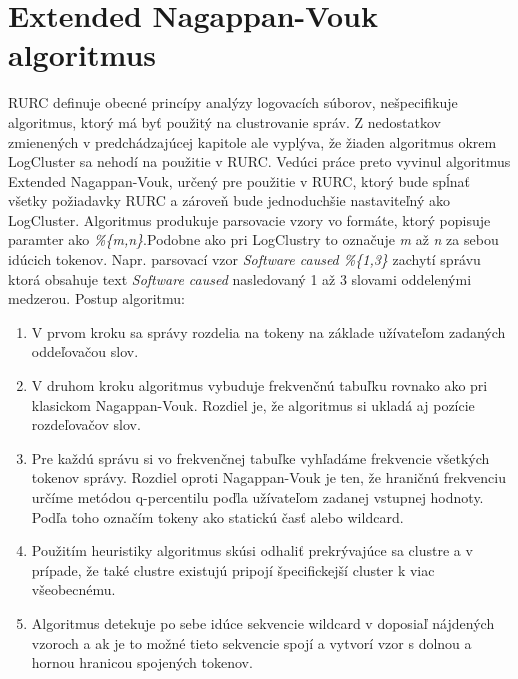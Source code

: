 \section{Extended Nagappan-Vouk algoritmus}
\label{sec:eng}
RURC definuje obecné princípy analýzy logovacích súborov, nešpecifikuje algoritmus, ktorý má byť použitý na clustrovanie správ.
Z nedostatkov zmienených v predchádzajúcej kapitole ale vyplýva, že žiaden algoritmus okrem LogCluster sa nehodí na použitie v RURC.
Vedúci práce preto vyvinul algoritmus Extended Nagappan-Vouk, určený pre použitie v RURC, ktorý bude spĺnať všetky požiadavky RURC a zároveň bude jednoduchšie nastaviteľný ako LogCluster. Algoritmus produkuje parsovacie vzory vo formáte, ktorý popisuje paramter ako \emph{\%\{m,n\}}.Podobne ako pri LogClustry to označuje \emph{m} až \emph{n} za sebou idúcich tokenov. Napr. parsovací vzor \emph{Software caused \%\{1,3\}} zachytí správu ktorá obsahuje text \emph{Software caused} nasledovaný 1 až 3 slovami oddelenými medzerou. Postup algoritmu: 

\begin{enumerate}
 \item V prvom kroku sa správy rozdelia na tokeny na základe užívateľom zadaných oddeľovačou slov.
 \item V druhom kroku algoritmus vybuduje frekvenčnú tabuľku rovnako ako pri klasickom Nagappan-Vouk. Rozdiel je, že algoritmus si ukladá aj pozície rozdeľovačov slov.
 \item Pre každú správu si vo frekvenčnej tabuľke vyhľadáme frekvencie všetkých tokenov správy. Rozdiel oproti Nagappan-Vouk je ten, že hraničnú frekvenciu určíme metódou q-percentilu poďla užívateľom zadanej vstupnej hodnoty. Podľa toho označím tokeny ako statickú časť alebo wildcard.
 \item Použitím heuristiky algoritmus skúsi odhaliť prekrývajúce sa clustre a v prípade, že také clustre existujú pripojí špecifickejší cluster k viac všeobecnému.
 \item Algoritmus detekuje po sebe idúce sekvencie wildcard v doposiaľ nájdených vzoroch a ak je to možné tieto sekvencie spojí a vytvorí
 vzor s dolnou a hornou hranicou spojených tokenov.
\end{enumerate}

